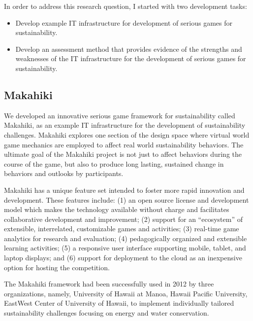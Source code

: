 In order to address this research question, I started with two development tasks:
\begin{itemize}
    \item Develop example IT infrastructure for development of serious games for sustainability.

    \item Develop an assessment method that provides evidence of the strengths and weaknesses of the IT infrastructure for the development of serious games for sustainability.
\end{itemize}

\subsection{Makahiki}

We developed an innovative serious game framework for sustainability called Makahiki, as an example IT infrastructure for the development of sustainability challenges. Makahiki explores one section of 
the design space where virtual world game mechanics are employed to affect real world sustainability
behaviors.  The ultimate goal of the Makahiki project is not just to affect behaviors during the course
 of the game, but also to produce long lasting, sustained change in behaviors and outlooks by participants.

 Makahiki has a unique feature set intended to foster more rapid innovation and development. These 
 features include: (1) an open source license and development model which makes the technology 
 available without charge and facilitates collaborative development and improvement; (2) support for an ``ecosystem'' of extensible, interrelated, customizable games and activities; (3) real-time game 
 analytics for research and evaluation; (4) pedagogically organized and extensible learning activities; 
 (5) a responsive user interface supporting mobile, tablet, and laptop displays; and (6) support for 
 deployment to the cloud as an inexpensive option for hosting the competition.

The Makahiki framework had been successfully used in 2012 by three organizations, namely, University of
Hawaii at Manoa, Hawaii Pacific University, EastWest Center of University of Hawaii, to implement
individually tailored sustainability challenges focusing on energy and water conservation.

